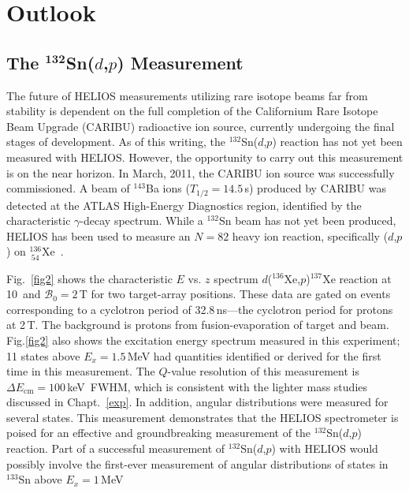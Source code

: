 \section{Outlook}
\subsection[\texorpdfstring{The $^\text{132}$S\lowercase{n($d$,$p$)} Measurement}{The 132Sn(d,p) Measurement}]{\texorpdfstring{The $^\mathbf{132}$Sn($d$,$p$) Measurement}{The 132Sn(d,p) Measurement}}
The future of HELIOS measurements utilizing rare isotope beams far from stability is dependent on the full completion of the Californium Rare Isotope Beam Upgrade (CARIBU) radioactive ion source, currently  undergoing the final stages of development.
As of this writing, the $^{132}$Sn($d$,$p$) reaction has not yet been measured with HELIOS.  However, the opportunity to carry out this measurement is on the near horizon. 
 In March, 2011, the CARIBU ion source was successfully commissioned.  A beam of $^{143}$Ba ions ($T_{1/2}=14.5$\,s) produced by CARIBU was detected at the ATLAS High-Energy Diagnostics region, %
  identified by the characteristic $\gamma$-decay spectrum.  While a $^{132}$Sn beam has not yet been produced, HELIOS has been used to measure an $N=82$ heavy ion reaction, specifically ($d$,$p$) on $^{136}_{~54}$Xe~\cite{Kay_2011}.  

Fig.~\ref{fig2} shows the characteristic $E$ vs. $z$ spectrum $d$($^{136}$Xe,$p$)$^{137}$Xe reaction at 10\,\AMeV{} and $\mathscr{B}_0=2$\,T for two target-array positions.  These data are gated on events corresponding to a cyclotron period of 32.8\,ns---the cyclotron period for protons at 2\,T. The background is protons from fusion-evaporation of target and beam.  Fig.\ref{fig2} also shows the excitation energy spectrum measured in this experiment; 11 states above $E_x=1.5$\,MeV had quantities identified or derived for the first time in this measurement.  The $Q$-value resolution of this measurement is $\Delta E_\mathrm{cm}=100$\,keV~FWHM, which is consistent with the lighter mass studies discussed in Chapt.~\ref{exp}. 
In addition, angular distributions were measured for several states.  This measurement demonstrates that the HELIOS spectrometer is poised for an effective and groundbreaking measurement of the $^{132}$Sn($d$,$p$) reaction.  Part of a successful measurement of $^{132}$Sn($d$,$p$) with HELIOS would possibly involve the first-ever measurement of angular distributions of states in $^{133}$Sn above $E_x=1$\,MeV

